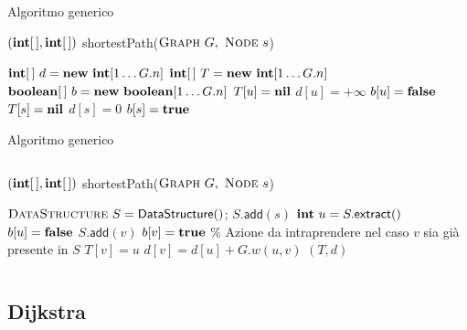 \begin{frame}{Algoritmo generico}

\vspace{-6pt}
\begin{Procedure}
\caption[A]{$(\INTARRAY, \INTARRAY)$ \textsf{shortestPath}($\textsc{Graph}\ G,\ \textsc{Node}\ s$)}

$\INTEGER[\,]\ d = \NEW\ \INTEGER[1 \mldots G.n]$
$\INTEGER[\,]\ T = \NEW\ \INTEGER[1 \mldots G.n]$
$\BOOLEAN[\,]\ b = \NEW\ \BOOLEAN[1 \mldots G.n]$
{
  $T[u] = \textbf{nil}$\;
  $d[u] = +\infty$\; 
  $b[u] = \FALSE$\;
}
$T[s] = \textbf{nil}$\; 
$d[s] = 0$\; 
$b[s] = \TRUE$\;
[...]
\end{Procedure}

\end{frame}


\begin{frame}{Algoritmo generico}

\vspace{-24pt}
\begin{columns}
\small
\begin{Procedure}
\caption[A]{$(\INTARRAY, \INTARRAY)$ \textsf{shortestPath}($\textsc{Graph}\ G,\ \textsc{Node}\ s$)}
\alert{$\textsc{DataStructure}\ S = \textsf{DataStructure}()$; $S.\textsf{add}(s)$}\;
{
  \alert{$\INTEGER\ u = S.\textsf{extract}()$}\;
  $b[u] = \FALSE$\;
  {
    {
      {
        \alert{$S.\textsf{add}(v)$}\;
                $b[v] = \TRUE$\;
      }
      {
        \alert{\% Azione da intraprendere nel caso $v$ sia già presente in $S$}
      }
      $T[v] = u$\;
      $d[v] = d[u] + G.w(u,v)$\;
    }
  }
}
\Return $(T,d)$
\end{Procedure}
\end{columns}

\end{frame}

\subsection{Dijkstra}


